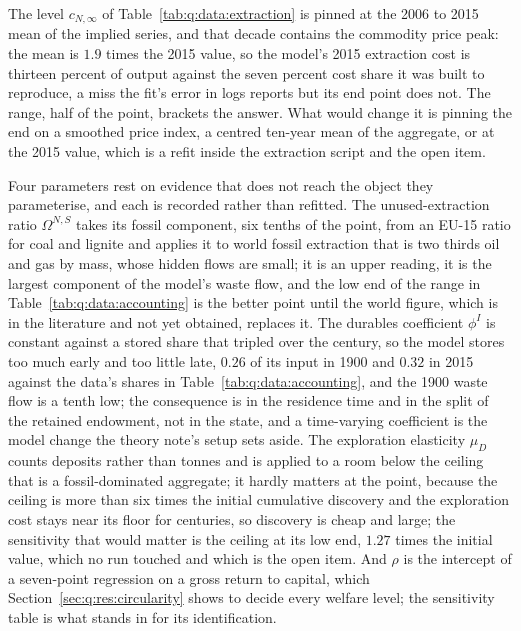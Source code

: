  The level $c_{N,\infty}$ of Table~\ref{tab:q:data:extraction} is pinned at the 2006 to 2015 mean of the implied series, and that decade contains the commodity price peak: the mean is $1.9$ times the 2015 value, so the model's 2015 extraction cost is thirteen percent of output against the seven percent cost share it was built to reproduce, a miss the fit's error in logs reports but its end point does not. The range, half of the point, brackets the answer. What would change it is pinning the end on a smoothed price index, a centred ten-year mean of the aggregate, or at the 2015 value, which is a refit inside the extraction script and the open item.

 Four parameters rest on evidence that does not reach the object they parameterise, and each is recorded rather than refitted. The unused-extraction ratio $\Omega^{N,S}$ takes its fossil component, six tenths of the point, from an EU-15 ratio for coal and lignite and applies it to world fossil extraction that is two thirds oil and gas by mass, whose hidden flows are small; it is an upper reading, it is the largest component of the model's waste flow, and the low end of the range in Table~\ref{tab:q:data:accounting} is the better point until the world figure, which is in the literature and not yet obtained, replaces it. The durables coefficient $\phi^I$ is constant against a stored share that tripled over the century, so the model stores too much early and too little late, $0.26$ of its input in 1900 and $0.32$ in 2015 against the data's shares in Table~\ref{tab:q:data:accounting}, and the 1900 waste flow is a tenth low; the consequence is in the residence time and in the split of the retained endowment, not in the state, and a time-varying coefficient is the model change the theory note's setup sets aside. The exploration elasticity $\mu_D$ counts deposits rather than tonnes and is applied to a room below the ceiling that is a fossil-dominated aggregate; it hardly matters at the point, because the ceiling is more than six times the initial cumulative discovery and the exploration cost stays near its floor for centuries, so discovery is cheap and large; the sensitivity that would matter is the ceiling at its low end, $1.27$ times the initial value, which no run touched and which is the open item. And $\rho$ is the intercept of a seven-point regression on a gross return to capital, which Section~\ref{sec:q:res:circularity} shows to decide every welfare level; the sensitivity table is what stands in for its identification.

